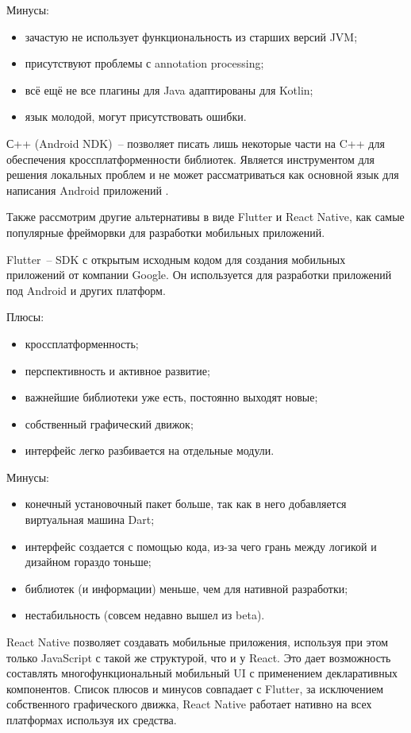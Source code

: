 Минусы:
\begin{itemize}
 \item зачастую не использует функциональность из старших версий JVM;
 \item присутствуют проблемы с annotation processing;
 \item всё ещё не все плагины для Java адаптированы для Kotlin;
 \item язык молодой, могут присутствовать ошибки.
\end{itemize}

С++ (Android NDK)~-- позволяет писать лишь некоторые части на C++ для обеспечения кроссплатформенности библиотек. Является инструментом для решения локальных проблем и не может рассматриваться как основной язык для написания Android приложений \cite{web12}.

Также рассмотрим другие альтернативы в виде Flutter и React Native, как самые популярные фрейморвки для разработки мобильных приложений.

Flutter~-- SDK с открытым исходным кодом для создания мобильных приложений от компании Google. Он используется для разработки приложений под Android и других платформ.

Плюсы:
\begin{itemize}
 \item кроссплатформенность;
 \item перспективность и активное развитие;
 \item важнейшие библиотеки уже есть, постоянно выходят новые;
 \item собственный графический движок;
 \item интерфейс легко разбивается на отдельные модули.
\end{itemize}

Минусы:
\begin{itemize}
 \item конечный установочный пакет больше, так как в него добавляется виртуальная машина Dart;
 \item интерфейс создается с помощью кода, из-за чего грань между логикой и дизайном гораздо тоньше;
 \item библиотек (и информации) меньше, чем для нативной разработки;
 \item нестабильность (совсем недавно вышел из beta).
\end{itemize}


React Native позволяет создавать мобильные приложения, используя при этом только JavaScript с такой же структурой, что и у React. Это дает возможность составлять многофункциональный мобильный UI с применением декларативных компонентов. Список плюсов и минусов совпадает с Flutter, за исключением собственного графического движка, React Native работает нативно на всех платформах используя их средства.

